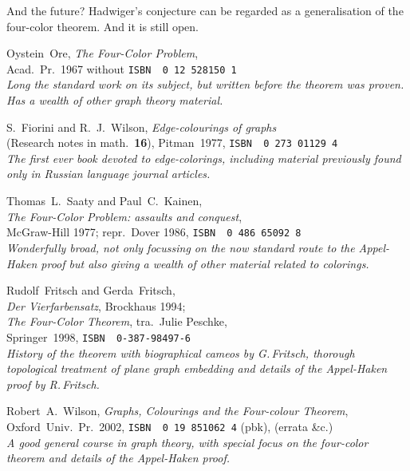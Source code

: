 \documentclass[12pt]{article}
\def\bitem#1{\bibitem[#1]{#1}}
\def\name#1{{\sc #1}}
\def\book#1{{\sl #1\/}}
\def\vol#1{{\bf #1}}
\def\isbn#1{{\small\tt ISBN\,\,#1}}
\begin{document}
And the future? Hadwiger's conjecture can be regarded as a generalisation of the four-color theorem. And it is still open.

\vfill\pagebreak
\raggedright
\begin{thebibliography}{MST73}

\bitem{Ore67} \name{Oystein~Ore}, \book{The Four-Color Problem},\\
              Acad.~Pr.~1967 without \isbn{0\,12\,528150\,1}\\
              {\it Long the standard work on its subject, but written before
              the theorem was proven. Has a wealth of other graph theory
              material.}

\bitem{FW77}  \name{S.~Fiorini} and \name{R.~J.~Wilson},
              \book{Edge-colourings of graphs}\\
              (Research notes in math.~\vol{16}), Pitman~1977,
              \isbn{0\,273\,01129\,4}\\
              {\em The first ever book devoted to edge-colorings,
              including material previously found only in Russian
              language journal articles.}

\bitem{SK77}  \name{Thomas~L.~Saaty} and \name{Paul~C.~Kainen},\\
              \book{The Four-Color Problem: assaults and conquest},\\
              McGraw-Hill 1977; repr.\ Dover 1986,
              \isbn{0\,486\,65092\,8}\\
              {\em Wonderfully broad, not only focussing on the now standard
              route to the Appel-Haken proof but also giving a wealth of
              other material related to colorings.}

\bitem{FF94}  \name{Rudolf~Fritsch} and \name{Gerda~Fritsch},\\
              \book{Der Vierfarbensatz}, Brockhaus 1994;\\
              \book{The Four-Color Theorem}, tra.\ \name{Julie Peschke},\\
              Springer~1998, \isbn{0-387-98497-6}\\
              {\em History of the theorem with biographical cameos by
              G.\,Fritsch, thorough topological treatment of plane
              graph embedding and details of the Appel-Haken proof by
              R.\,Fritsch.}

\bitem{Wil02} \name{Robert~A.~Wilson},
              \book{Graphs, Colourings and the Four-colour Theorem},
              Oxford~Univ.~Pr.~2002, \isbn{0\,19\,851062\,4} (pbk),
{\tt{}}
              (errata \&c.)\\
              {\em A good general course in graph theory, with special focus on
              the four-color theorem and details of the Appel-Haken proof.}

\end{thebibliography}
\end{document}
